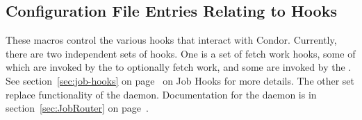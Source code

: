 \subsection{\label{sec:Config-hooks}Configuration File Entries Relating to Hooks}

These macros control the various hooks that interact with Condor.
Currently, there are two independent sets of hooks.
One is a set of fetch work hooks, some of which are invoked by
the  to optionally fetch work,
and some are invoked by the .
See section~\ref{sec:job-hooks} on page~\pageref{sec:job-hooks} on
Job Hooks for more details.
The other set replace functionality of the  daemon.
Documentation for the  daemon is in
section~\ref{sec:JobRouter} on page~\pageref{sec:JobRouter}.

